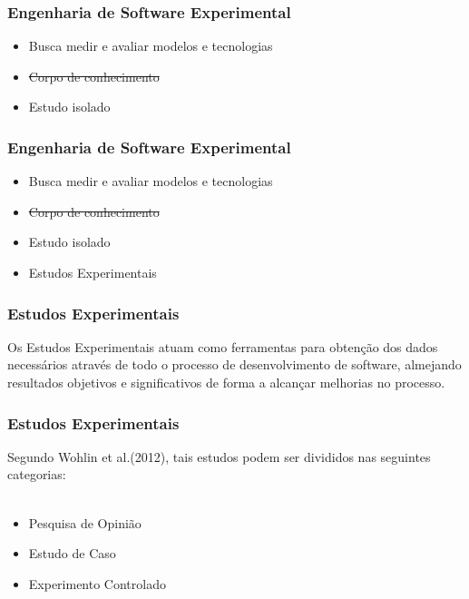 \documentclass[aspectratio=169]{beamer}
\begin{document}
\begin{frame}
\frametitle{Engenharia de Software Experimental}
\justifying

\begin{itemize}
\item Busca medir e avaliar modelos e tecnologias
\item \sout{Corpo de conhecimento}
\item Estudo isolado
\end{itemize}

\end{frame}

\begin{frame}
\frametitle{Engenharia de Software Experimental}
\justifying

\begin{itemize}
\item Busca medir e avaliar modelos e tecnologias
\item \sout{Corpo de conhecimento}
\item Estudo isolado
\item Estudos Experimentais
\end{itemize}

\end{frame}

\begin{frame}
\frametitle{Estudos Experimentais}
\justifying

Os Estudos Experimentais atuam como ferramentas para obtenção dos dados necessários através de todo o processo de desenvolvimento de software, almejando resultados objetivos e significativos de forma a alcançar melhorias no processo.

\end{frame}

\begin{frame}
\frametitle{Estudos Experimentais}
\justifying

Segundo Wohlin et al.(2012), tais estudos podem ser divididos nas seguintes categorias: \\~\\
\begin{itemize}
\item Pesquisa de Opinião
\item Estudo de Caso
\item Experimento Controlado
\end{itemize}

\end{frame}
\end{document}
